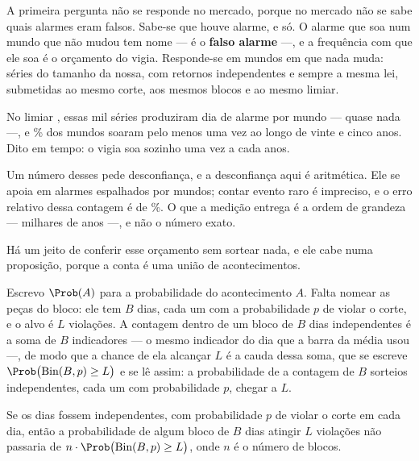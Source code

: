 A primeira pergunta não se responde no mercado, porque no mercado não se sabe quais alarmes
eram falsos. Sabe-se que houve alarme, e só. O alarme que soa num mundo que não mudou tem nome
--- é o \textbf{falso alarme} ---, e a frequência com que ele soa é o orçamento do vigia.
Responde-se em mundos em que nada muda:
\numVigiaMundos{} séries do tamanho da nossa, com retornos independentes e sempre a mesma
lei, submetidas ao mesmo corte, aos mesmos blocos e ao mesmo limiar.

No limiar \numVigiaLimiar{}, essas mil séries produziram \numVigiaDiasParadoPorMundo{} dia de
alarme por mundo --- quase nada ---, e \numVigiaMundosQueSoamPct\% dos mundos soaram pelo
menos uma vez ao longo de vinte e cinco anos. Dito em tempo: o vigia soa sozinho uma vez a
cada \numVigiaAnosParadoPorAlarme{} anos.

Um número desses pede desconfiança, e a desconfiança aqui é aritmética. Ele se apoia em
\numVigiaParadoAlarmes{} alarmes espalhados por \numVigiaMundos{} mundos; contar evento raro
é impreciso, e o erro relativo dessa contagem é de \numVigiaParadoErroPct\%. O que a medição
entrega é a ordem de grandeza --- milhares de anos ---, e não o número exato.

Há um jeito de conferir esse orçamento sem sortear nada, e ele cabe numa proposição, porque a
conta é uma união de acontecimentos.

Escrevo $\Prob(A)$ para a probabilidade do acontecimento $A$. Falta nomear as peças do bloco:
ele tem $B$ dias, cada um com a probabilidade $p$ de violar o corte, e o alvo é $L$ violações.
A contagem dentro de um bloco de $B$ dias independentes é a soma de $B$ indicadores --- o mesmo indicador
do dia que a barra da média usou ---, de modo que a chance de ela alcançar $L$ é a cauda dessa soma, que se escreve
$\Prob\big(\text{Bin}(B, p) \geq L\big)$ e se lê assim: a probabilidade de a contagem de
$B$ sorteios independentes, cada um com probabilidade $p$, chegar a $L$.

\begin{proposicao}
\label{prop:teto}
Se os dias fossem independentes, com probabilidade $p$ de violar o corte em cada dia, então a
probabilidade de algum bloco de $B$ dias atingir $L$ violações não passaria de
$n \cdot \Prob\big(\text{Bin}(B, p) \geq L\big)$, onde $n$ é o número de blocos.
\end{proposicao}

